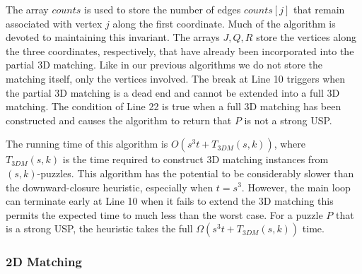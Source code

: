 \documentclass[11pt]{article}
\begin{document}
The array $counts$ is used to store the number of edges $counts[j]$
that remain associated with vertex $j$ along the first coordinate.
Much of the algorithm is devoted to maintaining this invariant.  The
arrays $J,Q,R$ store the vertices along the three coordinates,
respectively, that have already been incorporated into the partial 3D
matching.  Like in our previous algorithms we do not store the
matching itself, only the vertices involved.  The break at Line 10
triggers when the partial 3D matching is a dead end and cannot be
extended into a full 3D matching.  The condition of Line 22 is true
when a full 3D matching has been constructed and causes the algorithm
to return that $P$ is not a strong USP.

The running time of this algorithm is $O(s^3 t + T_{3DM}(s,k))$, where
$T_{3DM}(s,k)$ is the time required to construct 3D matching
instances from $(s,k)$-puzzles.  This algorithm has the potential to
be considerably slower than the downward-closure heuristic, especially
when $t = s^3$.  However, the main loop can terminate early at Line 10
when it fails to extend the 3D matching this permits the expected time
to much less than the worst case.  For a puzzle $P$ that is a strong
USP, the heuristic takes the full $\Omega(s^3 t + T_{3DM}(s,k))$ time.  


\begin{comment}
\subsubsection{Random}

XXX - There's also a random reordering heuristic, but I don't remember
the justification for it.  It's more elaborate than the other, but
less motivated.
 
\subsubsection{Graph Automorphism}

A strong uniquely-solvable puzzle must also be a uniquely-solvable
puzzle.  Given a puzzle $P$ we can construct a graph $G_P$ such that
$G_P$ is rigid iff $P$ is a uniquely-solvable puzzle.

XXX - I don't think this idea worked out.  The code correctly
implemented the approach, but the approach was flawed.  Probably
remove this section or add to future work.

\end{comment}

\subsubsection{2D Matching}
\end{document}
